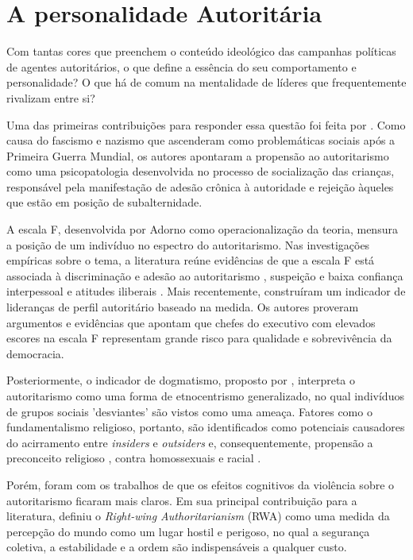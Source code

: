 \documentclass[
12pt,				%
openright,			%
twoside,			%
a4paper,			%
english,			%
french,				%
spanish,			%
brazil				%
]{abntex2}
\begin{document}
\section{A personalidade Autoritária}

Com tantas cores que preenchem o conteúdo ideológico das campanhas políticas de agentes autoritários, o que define a essência do seu comportamento e personalidade? O que há de comum na mentalidade de líderes que frequentemente rivalizam entre si?

Uma das primeiras contribuições para responder essa questão foi feita por . Como causa do fascismo e nazismo que ascenderam como problemáticas sociais após a Primeira Guerra Mundial, os autores apontaram a propensão ao autoritarismo como uma psicopatologia desenvolvida no processo de socialização das crianças, responsável pela manifestação de adesão crônica à autoridade e rejeição àqueles que estão em posição de subalternidade. 

A escala F, desenvolvida por Adorno como operacionalização da teoria, mensura a posição de um indivíduo no espectro do autoritarismo. Nas investigações empíricas sobre o tema, a literatura reúne evidências de que a escala F está associada à discriminação e adesão ao autoritarismo \cite{titus1957california, meloen1993f}, suspeição e baixa confiança interpessoal \cite{deutsch1960trust} e atitudes iliberais \cite{meloen1993f}. Mais recentemente,  construíram um indicador de lideranças de perfil autoritário baseado na medida. Os autores proveram argumentos e evidências que apontam que chefes do executivo com elevados escores na escala F representam grande risco para qualidade e sobrevivência da democracia.

Posteriormente, o indicador de dogmatismo, proposto por , interpreta o autoritarismo como uma forma de etnocentrismo generalizado, no qual indivíduos de grupos sociais 'desviantes' são vistos como uma ameaça. Fatores como o fundamentalismo religioso, portanto, são identificados como potenciais causadores do acirramento entre \emph{insiders} e \emph{outsiders} e, consequentemente, propensão a preconceito religioso \cite{laythe2001predicting}, contra homossexuais \cite{hunsberger1996religious, jonathan2008influence} e racial \cite{rowatt2004christian}.

Porém, foram com os trabalhos de  que os efeitos cognitivos da violência sobre o autoritarismo ficaram mais claros. Em sua principal contribuição para a literatura, definiu o \emph{Right-wing Authoritarianism} (RWA) como uma medida da percepção do mundo como um lugar hostil e perigoso, no qual a segurança coletiva, a estabilidade e a ordem são indispensáveis a qualquer custo.
\end{document}
